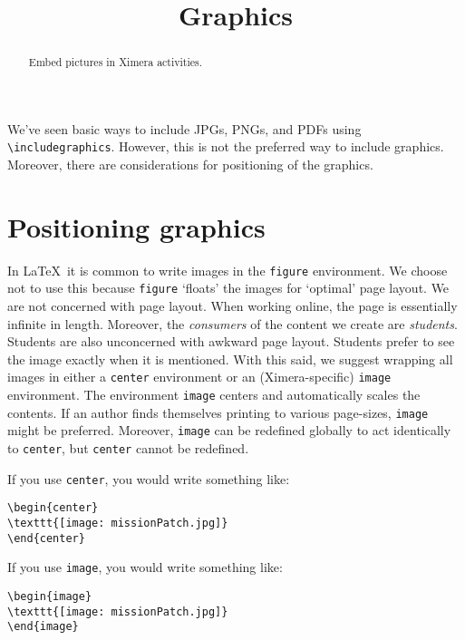 \documentclass{ximera}
\title{Graphics}
\begin{document}
\begin{abstract}
  Embed pictures in Ximera activities.
\end{abstract}
\maketitle

We've seen basic ways to include JPGs, PNGs, and PDFs using
\verb!\includegraphics!. However, this is not the preferred way to include
graphics. Moreover, there are considerations for positioning of the graphics.

\section{Positioning graphics}

In \LaTeX\ it is common to write images in the \verb!figure! environment. We
choose not to use this because \verb!figure! `floats' the images for `optimal'
page layout. We are not concerned with page layout. When working online, the
page is essentially infinite in length. Moreover, the \textit{consumers} of the
content we create are \textit{students}. Students are also unconcerned with
awkward page layout. Students prefer to see the image exactly when it is
mentioned. With this said, we suggest wrapping all images in either a
\verb!center! environment or an (Ximera-specific) \verb!image! environment.
The environment \verb!image! centers and automatically scales the contents.  If
an author finds themselves printing to various page-sizes, \verb!image! might
be preferred. Moreover, \verb!image! can be redefined globally to act
identically to \verb!center!, but \verb!center! cannot be redefined.

If you use \verb!center!, you would write something like:
\begin{verbatim}
\begin{center}
\texttt{[image: missionPatch.jpg]}
\end{center}
\end{verbatim}
If you use \verb!image!, you would write something like:
\begin{verbatim}
\begin{image}
\texttt{[image: missionPatch.jpg]}
\end{image}
\end{verbatim}
\end{document}
